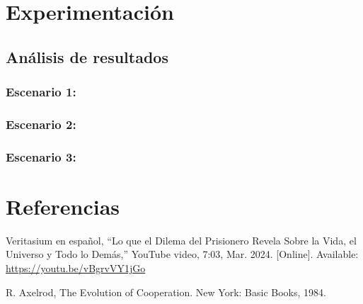 \documentclass{article}
\begin{document}
\section{Experimentación}\label{sec:exp}

\subsection{Análisis de resultados}

\subsubsection{Escenario 1: }

\subsubsection{Escenario 2: }
 
\subsubsection{Escenario 3: }



\section{Referencias}
\renewcommand{\refname}{}

\begin{thebibliography}{9}

 \label{ref:vidIntro} Veritasium en español, “Lo que el Dilema del Prisionero Revela 
Sobre la Vida, el Universo y Todo lo Demás,” YouTube video, 7:03, Mar. 2024. [Online]. 
Available: \url{https://youtu.be/vBgrvVY1jGo}

 \label{ref:just} R. Axelrod, The Evolution of Cooperation. New York: 
Basic Books, 1984.

\end{thebibliography}
\end{document}

